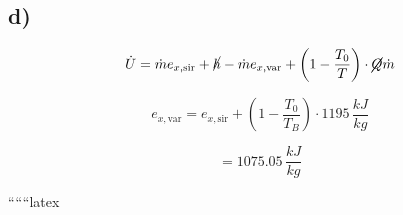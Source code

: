 

\subsection*{d)}

\[
\dot{U} = \dot{m} e_{x,\text{sir}} + \cancel{h} - \dot{m} e_{x,\text{var}} + \left( 1 - \frac{T_0}{T} \right) \cdot \cancel{Q} \dot{m}
\]

\[
e_{x,\text{var}} = e_{x,\text{sir}} + \left( 1 - \frac{T_0}{T_B} \right) \cdot 1195 \, \frac{kJ}{kg}
\]

\[
= 1075.05 \, \frac{kJ}{kg}
\]

``````latex